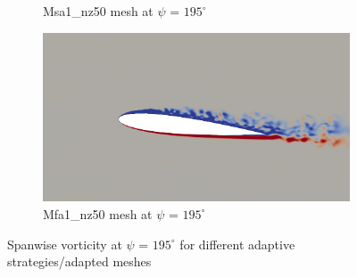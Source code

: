 \begin{figure}[H]
\begin{subfigure}[b]{0.475\textwidth}
\caption{Msa1\_nz50 mesh at $\psi$ = $195^\circ$}
\label{fig:hadapt_psi195}
\end{subfigure}
\begin{subfigure}[b]{0.475\textwidth}
\centering
\includegraphics[width=1\textwidth]{figures/adapt_strat/vorticity_plots/Mfa1_50/phase_195.png}
\caption{Mfa1\_nz50 mesh at $\psi$ = $195^\circ$}
\label{fig:FB_psi195}
\end{subfigure}
\caption{Spanwise vorticity at $\psi$ = $195^\circ$ for different adaptive strategies/adapted meshes}
\label{fig:vorticity_195}
\end{figure}



